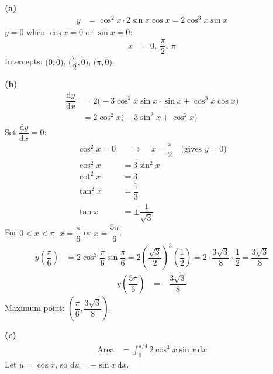 \documentclass[a4paper,11pt,oneside]{article}
\newcommand{\partlabel}[1]{\par\needspace{3\baselineskip}\smallskip\noindent\textbf{#1}\quad}
\newcommand{\dx}{\,\mathrm{d}x}
\begin{document}
\begin{solbox}
\partlabel{(a)}
\begin{align*}
y &= \cos^2 x\cdot 2\sin x\cos x = 2\cos^3 x\sin x
\end{align*}
$y=0$ when $\cos x = 0$ or $\sin x = 0$:
\begin{align*}
x &= 0,\ \dfrac{\pi}{2},\ \pi
\end{align*}
Intercepts: $\bigl(0,0\bigr)$, $\bigl(\dfrac{\pi}{2},0\bigr)$, $\bigl(\pi,0\bigr)$.
\begin{center}
\end{center}
\partlabel{(b)}
\begin{align*}
\dfrac{\mathrm{d}y}{\mathrm{d}x}
&= 2\bigl(-3\cos^2 x\sin x\cdot\sin x + \cos^3 x\cos x\bigr)\\
&= 2\cos^2 x\bigl(-3\sin^2 x + \cos^2 x\bigr)
\end{align*}
Set $\dfrac{\mathrm{d}y}{\mathrm{d}x}=0$:
\begin{align*}
\cos^2 x = 0 &\quad\Rightarrow\quad x = \dfrac{\pi}{2}
\quad\text{(gives $y=0$)}\\[1mm]
\cos^2 x &= 3\sin^2 x\\
\cot^2 x &= 3\\
\tan^2 x &= \dfrac{1}{3}\\
\tan x &= \pm\dfrac{1}{\sqrt{3}}
\end{align*}
For $0<x<\pi$: $x=\dfrac{\pi}{6}$ or $x=\dfrac{5\pi}{6}$.
\begin{align*}
y\left(\dfrac{\pi}{6}\right)
&= 2\cos^3\dfrac{\pi}{6}\sin\dfrac{\pi}{6}
= 2\left(\dfrac{\sqrt{3}}{2}\right)^3\left(\dfrac{1}{2}\right)
= 2\cdot\dfrac{3\sqrt{3}}{8}\cdot\dfrac{1}{2}
= \dfrac{3\sqrt{3}}{8}
\end{align*}
\begin{align*}
y\left(\dfrac{5\pi}{6}\right)
&= -\dfrac{3\sqrt{3}}{8}
\end{align*}
Maximum point: $\left(\dfrac{\pi}{6},\dfrac{3\sqrt{3}}{8}\right)$.
\partlabel{(c)}
\begin{align*}
\text{Area}
&= \int_{0}^{\pi/4} 2\cos^3 x\sin x\dx
\end{align*}
Let $u=\cos x$, so $\mathrm{d}u = -\sin x\dx$.


\end{solbox}
\end{document}
